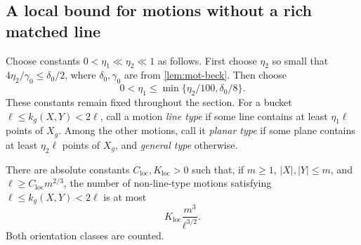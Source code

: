 \subsection{A local bound for motions without a rich matched line}

Choose constants $0<\eta_1\ll\eta_2\ll1$ as follows. First choose $\eta_2$ so small that $4\eta_2/\gamma_0\le\delta_0/2$, where $\delta_0,\gamma_0$ are from \cref{lem:mot-beck}. Then choose
\[
 0<\eta_1\le\min\{\eta_2/100,\delta_0/8\}.
\]
These constants remain fixed throughout the section. For a bucket $\ell\le k_g(X,Y)<2\ell$, call a motion \emph{line type} if some line contains at least $\eta_1\ell$ points of $X_g$.  Among the other motions, call it \emph{planar type} if some plane contains at least $\eta_2\ell$ points of $X_g$, and \emph{general type} otherwise.

\begin{lemma}
\label{lem:mot-local}
There are absolute constants $C_{\mathrm{loc}},K_{\mathrm{loc}}>0$ such that, if $m\ge1$, $|X|,|Y|\le m$, and $\ell\ge C_{\mathrm{loc}}m^{2/3}$, the number of non-line-type motions satisfying $\ell\le k_g(X,Y)<2\ell$ is at most
\[
 K_{\mathrm{loc}}\frac{m^3}{\ell^{3/2}}.
\]
Both orientation classes are counted.
\end{lemma}

